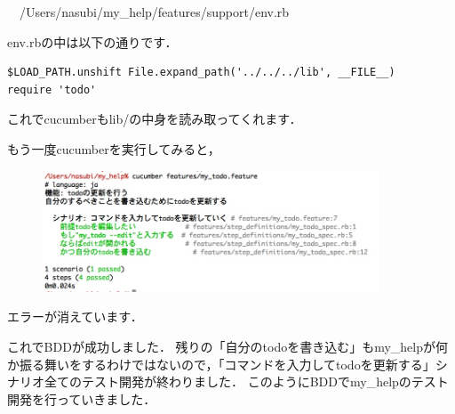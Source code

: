 　/Users/nasubi/my\_help/features/support/env.rb

env.rbの中は以下の通りです．
\begin{lstlisting}[style=customRuby]
$LOAD_PATH.unshift File.expand_path('../../../lib', __FILE__)
require 'todo'
\end{lstlisting}
これでcucumberもlib/の中身を読み取ってくれます．

もう一度cucumberを実行してみると，

\begin{figure}[htbp]\begin{center}
\includegraphics[width=10cm,bb= 0 0 737 453]{../figs/./cucumber4.jpg}
\caption{}
\label{default}\end{center}\end{figure}
エラーが消えています．

これでBDDが成功しました．
残りの「自分のtodoを書き込む」もmy\_helpが何か振る舞いをするわけではないので，「コマンドを入力してtodoを更新する」シナリオ全てのテスト開発が終わりました．
このようにBDDでmy\_helpのテスト開発を行っていきました．

